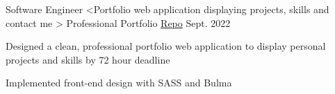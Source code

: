 

\begin{cventries}

  \cventry
  {Software Engineer <Portfolio web application displaying projects, skills and contact me >} %
    {Professional Portfolio} %
    {\href{https://github.com/sllozier/sarah-loziers-portfolio}{\faGithubSquare\acvHeaderIconSep\@github Repo} }%
    {Sept. 2022} %
      {
      \begin{cvitems} %
        \item {Designed a clean, professional portfolio web application to display personal projects and skills by 72 hour deadline}
        \item {Implemented front-end design with SASS and Bulma}
      \end{cvitems}
    }
    
\end{cventries}






